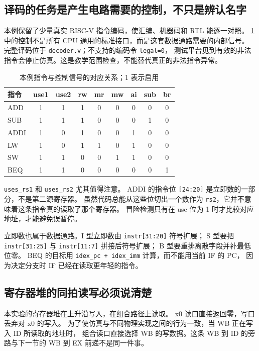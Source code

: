 \subsection{译码的任务是产生电路需要的控制，不只是辨认名字}

本例保留了少量真实 RISC-V 指令编码，使汇编、机器码和 RTL 能逐一对照。
\cref{tab:ch4-decode} 中的控制不是所有 CPU 通用的标准接口，而是这套数据通路需要的内部信号。
完整译码位于 \texttt{decoder.v}；不支持的编码令 \texttt{legal=0}，
测试平台见到有效的非法指令会停止仿真。这是教学范围检查，不能替代真正的非法指令异常。

\begin{table}[htbp]
\centering\small
\caption{本例指令与控制信号的对应关系；1 表示启用}\label{tab:ch4-decode}
\begin{tabular}{lcccccccc}
\toprule
指令 & use1 & use2 & rw & mr & mw & ai & sub & br \\\midrule
ADD  &1&1&1&0&0&0&0&0\\
SUB  &1&1&1&0&0&0&1&0\\
ADDI &1&0&1&0&0&1&0&0\\
LW   &1&0&1&1&0&1&0&0\\
SW   &1&1&0&0&1&1&0&0\\
BEQ  &1&1&0&0&0&0&0&1\\
\bottomrule
\end{tabular}
\end{table}

\texttt{uses\_rs1} 和 \texttt{uses\_rs2} 尤其值得注意。
ADDI 的指令位 \texttt{[24:20]} 是立即数的一部分，不是第二源寄存器。
虽然代码总能从这些位切出一个数作为 \texttt{rs2}，它并不意味着这条指令真的读取了那个寄存器。
冒险检测只有在 use 位为 1 时才比较对应地址，才能避免误暂停。

立即数也属于数据通路。I 型立即数由 \texttt{instr[31:20]} 符号扩展；
S 型要把 \texttt{instr[31:25]} 与 \texttt{instr[11:7]} 拼接后符号扩展；
B 型要重排离散字段并补最低位零。
BEQ 的目标用 \texttt{idex\_pc + idex\_imm} 计算，而不能用当前 IF 的 PC，
因为决定分支时 IF 已经在读取更年轻的指令。

\subsection{寄存器堆的同拍读写必须说清楚}

本实验的寄存器堆在上升沿写入，在组合路径上读取。
x0 读口直接返回零，写口丢弃对 x0 的写入。
为了使仿真与不同物理实现之间的行为一致，当 WB 正在写入 ID 所读取的地址时，
组合读口直接选择 WB 的写数据。这条 WB 到 ID 的旁路与下一节的 WB 到 EX 前递不是同一件事。

